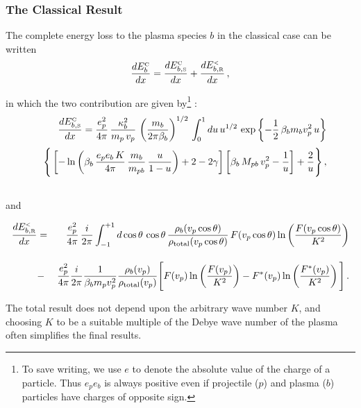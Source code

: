 \documentclass[preprint,12pt,eqsecnum,nofootinbib,amsmath,amssymb]{revtex4}
\newcommand{\smC}{{\rm\scriptscriptstyle C}}
\newcommand{\smR}{{\rm\scriptscriptstyle R}}
\newcommand{\smS}{{\rm\scriptscriptstyle S}}
\newcommand{\smLT}{{\rm\scriptscriptstyle <}}
\begin{document}
\subsubsection{The Classical Result}

The complete energy loss to the plasma species $b$  
in the classical case can be written\cite{bps}
\begin{equation}
  \frac{dE^{\smC}_b}{dx} 
 = 
 \frac{dE^\smC_{b,\smS}}{dx} 
  +
  \frac{dE^\smLT_{b,\smR}}{dx} \,,
\label{doneatlast}
\end{equation}



in which the two contribution are given by\footnote{
\baselineskip 15pt
To save writing, we use $e$
to denote the absolute value of the charge of 
a particle. Thus $e_p e_b$ is always positive 
even if projectile ($p$) and plasma ($b$) 
particles have charges of opposite sign.}
:
\begin{eqnarray}
  && {dE^\smC_{b,\smS} \over dx} =
  {e_p^2 \over 4\pi} \, 
	{\kappa^2_b \over m_p \, v_p} \,
  \left( { m_b \over  2\pi \beta_b  } \right)^{1/2} \,
  \int_0^1 du \, u^{1/2} \,
  \exp\left\{ - {1 \over 2} \,
  \beta_b m_b v^2_p \, u \right\}
\nonumber\\[2 pt]
  && \Bigg\{
  \left[ - \ln
  \left(\beta_b\,  { e_p e_b \, K \over 4 \pi}\, { m_b \over
  m_{pb} } \,
  { u \over 1-u} \right)  + 2 - 2\gamma \right]
  \left[  \beta_b \, M_{pb} \, v_p^2
  -  {1\over u} \right] + {2 \over u}  \Bigg\} \,,
\nonumber\\
  &&
\label{wonderclassicc} 
\end{eqnarray}
and

\begin{eqnarray}
  \frac{d E^\smLT_{b,\smR}}{dx}  
  &=&
  \frac{e_p^2}{4 \pi } \, \frac{ i }{2 \pi }
  \int_{-1}^{+1} d\cos\theta \, \cos\theta \,
  \frac{\rho_b(v_p\cos\theta)}{\rho_{\rm total}(v_p\cos\theta) } \, 
 F(v_p \cos\theta) \ln \left( \frac{ F(v_p \cos\theta)}{K^2}\right)
\nonumber\\[11 pt]
  &-&  {e_p^2 \over 4 \pi } { i \over 2 \pi }
  { 1 \over \beta_b m_p v_p^2 } 
	{\rho_b(v_p) \over 	\rho_{\rm total}(v_p) }\Bigg[ 
	F(v_p ) \ln \left( { F(v_p ) \over K^2 } \right) 
	- 
	F^*(v_p)\ln \left( { F^*(v_p) \over K^2 } \right) \Bigg] \,.
\label{nunn} 
\end{eqnarray}

The total result does not depend upon the arbitrary
wave number $K$, and choosing $K$ to be a suitable 
multiple of the Debye wave number of the plasma often 
simplifies the final results. 
\end{document}
